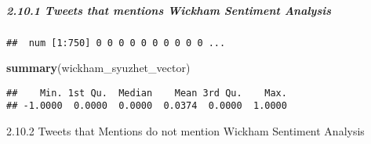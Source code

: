 \documentclass[]{article}
\newenvironment{Shaded}{\begin{snugshade}}{\end{snugshade}}
\newcommand{\CharTok}[1]{\textcolor[rgb]{0.31,0.60,0.02}{#1}}
\newcommand{\CommentTok}[1]{\textcolor[rgb]{0.56,0.35,0.01}{\textit{#1}}}
\newcommand{\DataTypeTok}[1]{\textcolor[rgb]{0.13,0.29,0.53}{#1}}
\newcommand{\KeywordTok}[1]{\textcolor[rgb]{0.13,0.29,0.53}{\textbf{#1}}}
\newcommand{\NormalTok}[1]{#1}
\newcommand{\OperatorTok}[1]{\textcolor[rgb]{0.81,0.36,0.00}{\textbf{#1}}}
\newcommand{\StringTok}[1]{\textcolor[rgb]{0.31,0.60,0.02}{#1}}
\let\oldsubparagraph\subparagraph
\renewcommand{\subparagraph}[1]{\oldsubparagraph{#1}\mbox{}}
\begin{document}
\hypertarget{tweets-that-mentions-wickham-sentiment-analysis}{%
\subparagraph{2.10.1 Tweets that mentions Wickham Sentiment
Analysis}\label{tweets-that-mentions-wickham-sentiment-analysis}}

\begin{Shaded}
\end{Shaded}

\begin{verbatim}
##  num [1:750] 0 0 0 0 0 0 0 0 0 0 ...
\end{verbatim}

\begin{Shaded}
\begin{Highlighting}[]
\KeywordTok{summary}\NormalTok{(wickham_syuzhet_vector)}
\end{Highlighting}
\end{Shaded}

\begin{verbatim}
##    Min. 1st Qu.  Median    Mean 3rd Qu.    Max. 
## -1.0000  0.0000  0.0000  0.0374  0.0000  1.0000
\end{verbatim}

2.10.2 Tweets that Mentions do not mention Wickham Sentiment Analysis

\begin{Shaded}
\end{Shaded}
\end{document}
